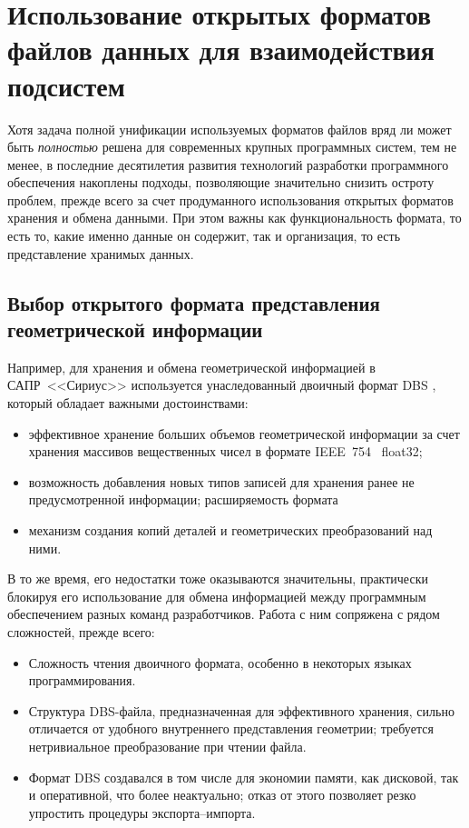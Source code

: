 
\section{%
  Использование открытых форматов файлов данных для взаимодействия подсистем
}
\label{sec:json.files}

Хотя задача полной унификации
используемых форматов файлов
вряд ли может быть
\textit{полностью}
решена для современных крупных программных систем,
тем не менее,
в последние десятилетия развития технологий
разработки программного обеспечения
накоплены подходы,
позволяющие значительно снизить остроту проблем,
прежде всего за счет продуманного использования
открытых форматов хранения и обмена данными.
При этом важны как функциональность формата,
то есть то, какие именно данные он содержит,
так и организация,
то есть представление
хранимых данных.

\subsection{Выбор открытого формата представления геометрической информации}

Например, для хранения и обмена геометрической информацией
в САПР~<<Сириус>>
используется унаследованный двоичный формат DBS
\cite{bi:DBS},
который обладает важными достоинствами:
\begin{itemize}
  \item
  эффективное хранение больших объемов геометрической информации
  за счет хранения массивов вещественных чисел в формате IEEE~754~\cite{bi:IEEE754} float32;
  \item
  возможность добавления новых типов записей для хранения ранее не предусмотренной информации;
  расширяемость формата
  \item
  механизм создания копий деталей и геометрических преобразований над ними.
\end{itemize}

В то же время,
его недостатки тоже оказываются
значительны,
практически блокируя его использование
для обмена информацией между
программным обеспечением разных команд разработчиков.
Работа с ним сопряжена с рядом сложностей,
прежде всего:
\begin{itemize}
  \item
  Сложность чтения двоичного формата,
  особенно в некоторых языках программирования.
  \item
  Структура DBS-файла,
  предназначенная для эффективного хранения,
  сильно отличается от удобного внутреннего представления
  геометрии;
  требуется нетривиальное преобразование при чтении файла.
  \item
  Формат DBS создавался в том числе для экономии памяти,
  как дисковой, так и оперативной,
  что более неактуально;
  отказ от этого позволяет резко упростить процедуры экспорта--импорта.
\end{itemize}

